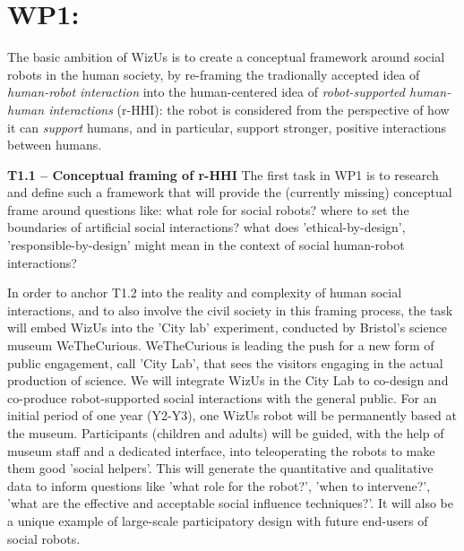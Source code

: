 \documentclass[11pt,a4paper]{report}
\newcommand{\project}{WizUs\xspace}
\begin{document}

\begin{figure}[!ht]
\resizebox{\linewidth}{!}{
    
}
\end{figure}



\section{WP1: \textbf{\wpOne}}

\noindent{}

The basic ambition of \project is to create a conceptual framework around social
robots in the human society, by re-framing the tradionally accepted idea of
\emph{human-robot interaction} into the human-centered idea of
\emph{robot-supported human-human interactions} (r-HHI): the robot is considered
from the perspective of how it can \emph{support} humans, and in particular,
support stronger, positive interactions between humans.

\textbf{T1.1 -- Conceptual framing of r-HHI} The first task in WP1 is to research and
define such a framework that will provide the (currently missing) conceptual
frame around questions like: what role for social robots? where to set the
boundaries of artificial social interactions? what does 'ethical-by-design',
'responsible-by-design' might mean in the context of social human-robot
interactions? 

In order to anchor T1.2 into the reality and complexity of human social
interactions, and to also involve the civil society in this framing process, the
task will embed \project into the 'City lab' experiment, conducted by Bristol's
science museum WeTheCurious. WeTheCurious is leading the push for a new form of
public engagement, call 'City Lab', that sees the visitors engaging in the
actual production of science. We will integrate \project in the City Lab to
co-design and co-produce robot-supported social interactions with the general
public. For an initial period of one year (Y2-Y3), one \project robot will be
permanently based at the museum.  Participants (children and adults) will be
guided, with the help of museum staff and a dedicated interface, into
teleoperating the robots to make them good 'social helpers'. This will generate
the quantitative and qualitative data to inform questions like 'what role for
the robot?', 'when to intervene?', 'what are the effective and acceptable social
influence techniques?'. It will also be a unique example of large-scale
participatory design with future end-users of social robots.
\end{document}
